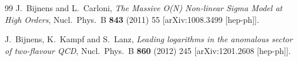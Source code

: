 \documentclass[cits,hyper]{PoS}
\begin{document}
\begin{thebibliography}{99}
 J.~Bijnens and L.~Carloni,
  \emph{The Massive O(N) Non-linear Sigma Model at High Orders},
  Nucl.\ Phys.\ B {\bf 843} (2011) 55
  [arXiv:1008.3499 [hep-ph]].

 J.~Bijnens, K.~Kampf and S.~Lanz,
  \emph{Leading logarithms in the anomalous sector of two-flavour QCD},
  Nucl.\ Phys.\ B {\bf 860} (2012) 245
  [arXiv:1201.2608 [hep-ph]].

\end{thebibliography}
\end{document}

